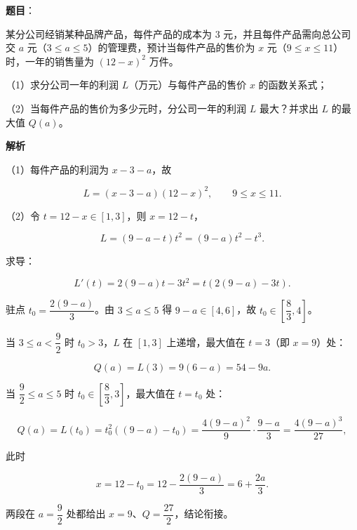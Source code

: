 \begin{answer}

\textbf{题目}：

某分公司经销某种品牌产品，每件产品的成本为 $3$ 元，并且每件产品需向总公司交 $a$ 元（$3\leqslant a\leqslant5$）的管理费，预计当每件产品的售价为 $x$ 元（$9\leqslant x\leqslant11$）时，一年的销售量为 $(12-x)^2$ 万件。

（1）求分公司一年的利润 $L$（万元）与每件产品的售价 $x$ 的函数关系式；

（2）当每件产品的售价为多少元时，分公司一年的利润 $L$ 最大？并求出 $L$ 的最大值 $Q(a)$。

\textbf{解析}

（1）每件产品的利润为 $x-3-a$，故

\nopagebreak[4]
\[L=(x-3-a)(12-x)^2,\qquad 9\leqslant x\leqslant11.\]

（2）令 $t=12-x\in[1,3]$，则 $x=12-t$，

\nopagebreak[4]
\[L=(9-a-t)t^2=(9-a)t^2-t^3.\]

求导：

\nopagebreak[4]
\[L'(t)=2(9-a)t-3t^2=t\left(2(9-a)-3t\right).\]

驻点 $t_0=\dfrac{2(9-a)}3$。由 $3\leqslant a\leqslant5$ 得 $9-a\in[4,6]$，故 $t_0\in\left[\dfrac83,4\right]$。

当 $3\leqslant a<\dfrac92$ 时 $t_0>3$，$L$ 在 $[1,3]$ 上递增，最大值在 $t=3$（即 $x=9$）处：

\nopagebreak[4]
\[Q(a)=L(3)=9(6-a)=54-9a.\]

当 $\dfrac92\leqslant a\leqslant5$ 时 $t_0\in\left[\dfrac83,3\right]$，最大值在 $t=t_0$ 处：

\nopagebreak[4]
\[Q(a)=L(t_0)=t_0^2\left((9-a)-t_0\right)=\frac{4(9-a)^2}9\cdot\frac{9-a}3=\frac{4(9-a)^3}{27},\]

此时

\nopagebreak[4]
\[x=12-t_0=12-\frac{2(9-a)}3=6+\frac{2a}3.\]

两段在 $a=\dfrac92$ 处都给出 $x=9$、$Q=\dfrac{27}2$，结论衔接。


\end{answer}
